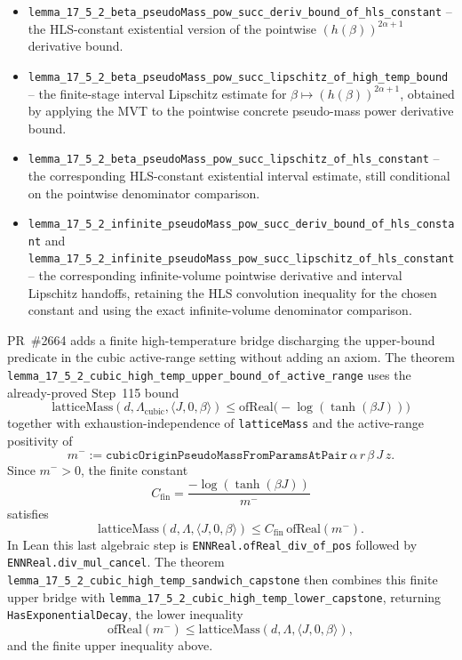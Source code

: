 \documentclass[a4paper,11pt]{article}
\begin{document}
\begin{itemize}
  -- the corresponding finite-stage derivative bound for
  $\beta\mapsto(h(\beta))^{2\alpha+1}$.
\item \texttt{lemma\_17\_5\_2\_beta\_pseudoMass\_pow\_succ\_deriv\_bound\_of\_hls\_constant}
  -- the HLS-constant existential version of the pointwise
  $(h(\beta))^{2\alpha+1}$ derivative bound.
\item \texttt{lemma\_17\_5\_2\_beta\_pseudoMass\_pow\_succ\_lipschitz\_of\_high\_temp\_bound}
  -- the finite-stage interval Lipschitz estimate for
  $\beta\mapsto(h(\beta))^{2\alpha+1}$, obtained by applying the MVT to the
  pointwise concrete pseudo-mass power derivative bound.
\item \texttt{lemma\_17\_5\_2\_beta\_pseudoMass\_pow\_succ\_lipschitz\_of\_hls\_constant}
  -- the corresponding HLS-constant existential interval estimate, still
  conditional on the pointwise denominator comparison.
\item \texttt{lemma\_17\_5\_2\_infinite\_pseudoMass\_pow\_succ\_deriv\_bound\_of\_hls\_constant}
  and
  \texttt{lemma\_17\_5\_2\_infinite\_pseudoMass\_pow\_succ\_lipschitz\_of\_hls\_constant}
  -- the corresponding infinite-volume pointwise derivative and interval
  Lipschitz handoffs, retaining the HLS convolution inequality for the chosen
  constant and using the exact infinite-volume denominator comparison.
\end{itemize}
PR~\#2664 adds a finite high-temperature bridge discharging the upper-bound
predicate in the cubic active-range setting without adding an axiom.
The theorem
\texttt{lemma\_17\_5\_2\_cubic\_high\_temp\_upper\_bound\_of\_active\_range}
uses the already-proved Step~115 bound
\[
  \mathrm{latticeMass}(d,\Lambda_{\mathrm{cubic}},\langle J,0,\beta\rangle)
  \leq
  \mathrm{ofReal}\bigl(-\log(\tanh(\beta J))\bigr)
\]
together with exhaustion-independence of \texttt{latticeMass} and the
active-range positivity of
\[
  m^- :=
  \texttt{cubicOriginPseudoMassFromParamsAtPair}\,\alpha\,r\,\beta\,J\,z.
\]
Since $m^- > 0$, the finite constant
\[
  C_{\mathrm{fin}} =
  \frac{-\log(\tanh(\beta J))}{m^-}
\]
satisfies
\[
  \mathrm{latticeMass}(d,\Lambda,\langle J,0,\beta\rangle)
  \leq C_{\mathrm{fin}}\,\mathrm{ofReal}(m^-).
\]
In Lean this last algebraic step is
\texttt{ENNReal.ofReal\_div\_of\_pos} followed by
\texttt{ENNReal.div\_mul\_cancel}.  The theorem
\texttt{lemma\_17\_5\_2\_cubic\_high\_temp\_sandwich\_capstone}
then combines this finite upper bridge with
\texttt{lemma\_17\_5\_2\_cubic\_high\_temp\_lower\_capstone}, returning
\texttt{HasExponentialDecay}, the lower inequality
\[
  \mathrm{ofReal}(m^-) \leq
  \mathrm{latticeMass}(d,\Lambda,\langle J,0,\beta\rangle),
\]
and the finite upper inequality above.
\end{document}
